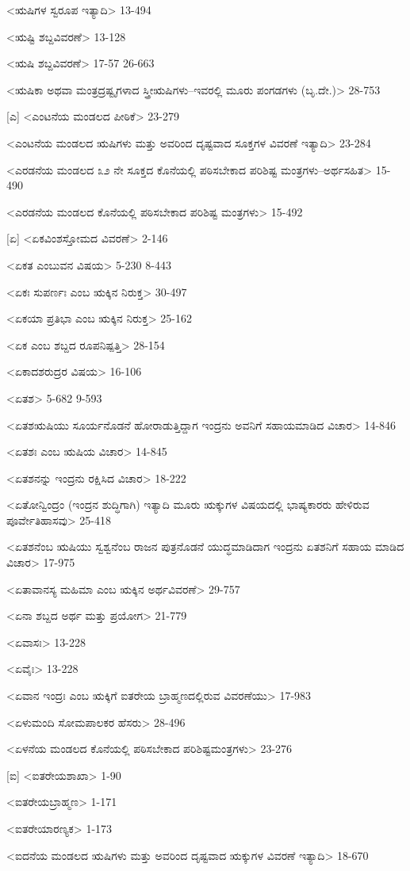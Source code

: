 <ಋಷಿಗಳ ಸ್ವರೂಪ ಇತ್ಯಾದಿ>
13-494

<ಋಷ್ಟಿ ಶಬ್ದವಿವರಣೆ>
13-128

<ಋಷಿ ಶಬ್ದವಿವರಣೆ>
17-57
26-663

<ಋಷಿಕಾ ಅಥವಾ ಮಂತ್ರದ್ರಷ್ಟೃಗಳಾದ ಸ್ತ್ರೀಋಷಿಗಳು–ಇವರಲ್ಲಿ ಮೂರು ಪಂಗಡಗಳು (ಬೃ.ದೇ.)>
28-753

[ಎ]
<ಎಂಟನೆಯ ಮಂಡಲದ ಪೀಠಿಕೆ>
23-279

<ಎಂಟನೆಯ ಮಂಡಲದ ಋಷಿಗಳು ಮತ್ತು ಅವರಿಂದ ದೃಷ್ಟವಾದ ಸೂಕ್ತಗಳ ವಿವರಣೆ ಇತ್ಯಾದಿ>
23-284

<ಎರಡನೆಯ ಮಂಡಲದ ೩೨ ನೇ ಸೂಕ್ತದ ಕೊನೆಯಲ್ಲಿ ಪಠಿಸಬೇಕಾದ ಪರಿಶಿಷ್ಟ ಮಂತ್ರಗಳು–ಅರ್ಥಸಹಿತ>
15-490

<ಎರಡನೆಯ ಮಂಡಲದ ಕೊನೆಯಲ್ಲಿ ಪಠಿಸಬೇಕಾದ ಪರಿಶಿಷ್ಟ ಮಂತ್ರಗಳು>
15-492

[ಏ]
<ಏಕವಿಂಶಸ್ತೋಮದ ವಿವರಣೆ>
2-146

<ಏಕತ ಎಂಬುವನ ವಿಷಯ>
5-230 
8-443

<ಏಕಃ ಸುಪರ್ಣಃ ಎಂಬ ಋಕ್ಕಿನ ನಿರುಕ್ತ>
30-497

<ಏಕಯಾ ಪ್ರತಿಭಾ ಎಂಬ ಋಕ್ಕಿನ ನಿರುಕ್ತ>
25-162

<ಏಕ ಎಂಬ ಶಬ್ದದ ರೂಪನಿಷ್ಪತ್ತಿ>
28-154

<ಏಕಾದಶರುದ್ರರ ವಿಷಯ>
16-106

<ಏತಶ>
5-682 
9-593

<ಏತಶಋಷಿಯು ಸೂರ್ಯನೊಡನೆ ಹೋರಾಡುತ್ತಿದ್ದಾಗ ಇಂದ್ರನು ಅವನಿಗೆ ಸಹಾಯಮಾಡಿದ ವಿಚಾರ>
14-846

<ಏತಶಃ ಎಂಬ ಋಷಿಯ ವಿಚಾರ>
14-845

<ಏತಶನನ್ನು ಇಂದ್ರನು ರಕ್ಷಿಸಿದ ವಿಚಾರ>
18-222

<ಏತೋನ್ವಿಂದ್ರಂ (ಇಂದ್ರನ ಶುದ್ಧಿಗಾಗಿ) ಇತ್ಯಾದಿ ಮೂರು ಋಕ್ಕುಗಳ ವಿಷಯದಲ್ಲಿ ಭಾಷ್ಯಕಾರರು ಹೇಳಿರುವ ಪೂರ್ವೇತಿಹಾಸವು>
25-418

<ಏತಶನೆಂಬ ಋಷಿಯು ಸ್ವಶ್ವನೆಂಬ ರಾಜನ ಪುತ್ರನೊಡನೆ ಯುದ್ಧಮಾಡಿದಾಗ ಇಂದ್ರನು ಏತಶನಿಗೆ ಸಹಾಯ ಮಾಡಿದ ವಿಚಾರ>
17-975

<ಏತಾವಾನಸ್ಯ ಮಹಿಮಾ ಎಂಬ ಋಕ್ಕಿನ ಅರ್ಥವಿವರಣೆ>
29-757

<ಏನಾ ಶಬ್ದದ ಅರ್ಥ ಮತ್ತು ಪ್ರಯೋಗ>
21-779

<ಏವಾಸಃ>
13-228

<ಏವೈಃ>
13-228

<ಏವಾನ ಇಂದ್ರಃ ಎಂಬ ಋಕ್ಕಿಗೆ ಐತರೇಯ ಬ್ರಾಹ್ಮಣದಲ್ಲಿರುವ ವಿವರಣೆಯು>
17-983

<ಏಳುಮಂದಿ ಸೋಮಪಾಲಕರ ಹೆಸರು>
28-496

<ಏಳನೆಯ ಮಂಡಲದ ಕೊನೆಯಲ್ಲಿ ಪಠಿಸಬೇಕಾದ ಪರಿಶಿಷ್ಟಮಂತ್ರಗಳು>
23-276

[ಐ]
<ಐತರೇಯಶಾಖಾ>
1-90

<ಐತರೇಯಬ್ರಾಹ್ಮಣ>
1-171

<ಐತರೇಯಾರಣ್ಯಕ>
1-173

<ಐದನೆಯ ಮಂಡಲದ ಋಷಿಗಳು ಮತ್ತು ಅವರಿಂದ ದೃಷ್ಟವಾದ ಋಕ್ಕುಗಳ ವಿವರಣೆ ಇತ್ಯಾದಿ>
18-670

